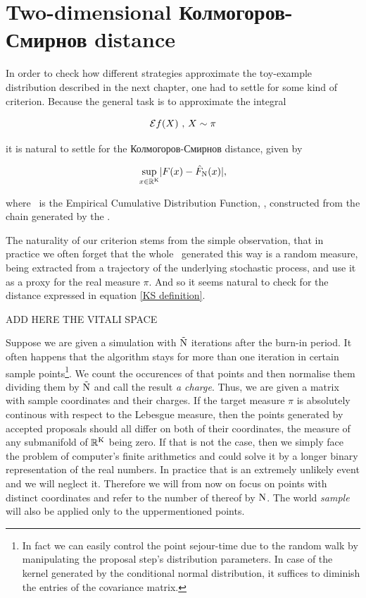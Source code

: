 \section{Two-dimensional Колмогоров-Смирнов distance}

In order to check how different strategies approximate the toy-example distribution described in the next chapter, one had to settle for some kind of criterion. Because the general task is to approximate the integral 

$$ \mathcal{E} f( X ) \text{  ,  } X \sim \pi$$

it is natural to settle for the Колмогоров-Смирнов distance, given by 

\begin{equation}\label{KS definition}
	\underset{x \in \mathbb{R}^{\mathrm{K}}}{\sup} | F(x) - \hat{F}_{\mathrm{N}} (x)|,
\end{equation}

where \Fecdf\, is the Empirical Cumulative Distribution Function, \ecdf , constructed from the chain generated by the \PT. 



The naturality of our criterion stems from the simple observation, that in practice we often forget that the whole \ecdf\, generated this way is a random measure, being extracted from a trajectory of the underlying stochastic process, and use it as a proxy for the real measure $\pi$. And so it seems natural to check for the distance expressed in equation \ref{KS definition}. 

ADD HERE THE VITALI SPACE

Suppose we are given a simulation with $\tilde{\mathrm{N}}$ iterations after the burn-in period. It often happens that the algorithm stays for more than one iteration in certain sample points\footnote{In fact we can easily control the point sejour-time due to the random walk by manipulating the proposal step's distribution parameters. In case of the kernel generated by the conditional normal distribution, it suffices to diminish the entries of the covariance matrix.}. We count the occurences of that points and then normalise them dividing them by $\tilde{\mathrm{N}}$ and call the result {\it a charge}. Thus, we are given a matrix with sample coordinates and their charges. If the target measure $\pi$ is absolutely continous with respect to the Lebesgue measure, then the points generated by accepted proposals should all differ on both of their coordinates, the measure of any submanifold of $\mathbb{R}^{\mathrm{K}}$ being zero. If that is not the case, then we simply face the problem of computer's finite arithmetics and could solve it by a longer binary representation of the real numbers. In practice that is an extremely unlikely event and we will neglect it. Therefore we will from now on focus on points with distinct coordinates and refer to the number of thereof by $\mathrm{N}$. The world {\it sample} will also be applied only to the uppermentioned points. 

